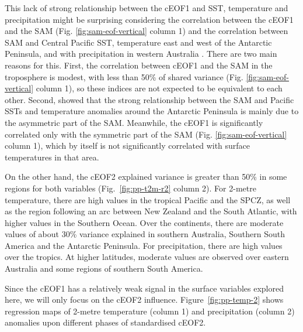 \documentclass[pdflatex,lineno,sn-basic]{sn-jnl}
\theoremstyle{thmstyleone}%
\theoremstyle{thmstyletwo}%
\theoremstyle{thmstylethree}%
\begin{document}
This lack of strong relationship between the cEOF1 and SST, temperature and precipitation might be surprising considering the correlation between the cEOF1 and the SAM (Fig. \ref{fig:sam-eof-vertical} column 1) and the correlation between SAM and Central Pacific SST, temperature east and west of the Antarctic Peninsula, and with precipitation in western Australia \citep{fogt2020}.
There are two main reasons for this.
First, the correlation between cEOF1 and the SAM in the troposphere is modest, with less than 50\% of shared variance (Fig. \ref{fig:sam-eof-vertical} column 1), so these indices are not expected to be equivalent to each other.
Second, \citet{campitelli2022} showed that the strong relationship between the SAM and Pacific SSTs and temperature anomalies around the Antarctic Peninsula is mainly due to the asymmetric part of the SAM.
Meanwhile, the cEOF1 is significantly correlated only with the symmetric part of the SAM (Fig. \ref{fig:sam-eof-vertical} column 1), which by itself is not significantly correlated with surface temperatures in that area.

On the other hand, the cEOF2 explained variance is greater than 50\% in some regions for both variables (Fig.~\ref{fig:pp-t2m-r2} column 2).
For 2-metre temperature, there are high values in the tropical Pacific and the SPCZ, as well as the region following an arc between New Zealand and the South Atlantic, with higher values in the Southern Ocean.
Over the continents, there are moderate values of about 30\% variance explained in southern Australia, Southern South America and the Antarctic Peninsula.
For precipitation, there are high values over the tropics. At higher latitudes, moderate values are observed over eastern Australia and some regions of southern South America.

Since the cEOF1 has a relatively weak signal in the surface variables explored here, we will only focus on the cEOF2 influence.
Figure~\ref{fig:pp-temp-2} shows regression maps of 2-metre temperature (column 1) and precipitation (column 2) anomalies upon different phases of standardised cEOF2.
\end{document}
